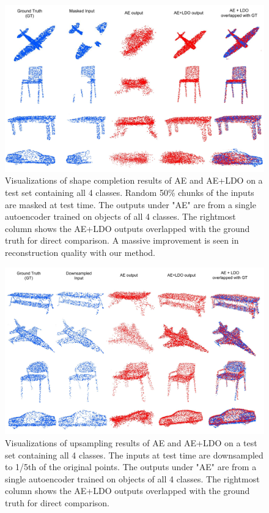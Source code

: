 \documentclass[10pt,twocolumn,letterpaper]{article}
\begin{document}
\begin{figure}
\vspace{-10pt}
\begin{center}
\includegraphics[width=1\linewidth]{masked_ae.pdf}
\end{center}
\vspace{-10pt}
   \caption{Visualizations of shape completion results of AE and AE+LDO on a test set containing all 4 classes. Random 50\% chunks of the inputs are masked at test time. The outputs under "AE" are from a single autoencoder trained on objects of all 4 classes. The rightmost column shows the AE+LDO outputs overlapped with the ground truth for direct comparison. A massive improvement is seen in reconstruction quality with our method.}
\label{fig:masked_ae}
\end{figure}


\begin{figure}
\vspace{-10pt}
\begin{center}
\includegraphics[width=1\linewidth]{Upsampling_ae.pdf}
\end{center}
\vspace{-15pt}
   \caption{Visualizations of upsampling results of AE and AE+LDO on a test set containing all 4 classes. The inputs at test time are downsampled to 1/5th of the original points. The outputs under "AE" are from a single autoencoder trained on objects of all 4 classes. The rightmost column shows the AE+LDO outputs overlapped with the ground truth for direct comparison.}
\vspace{-15pt}
\label{fig:upsampling}
\end{figure}
\end{document}
